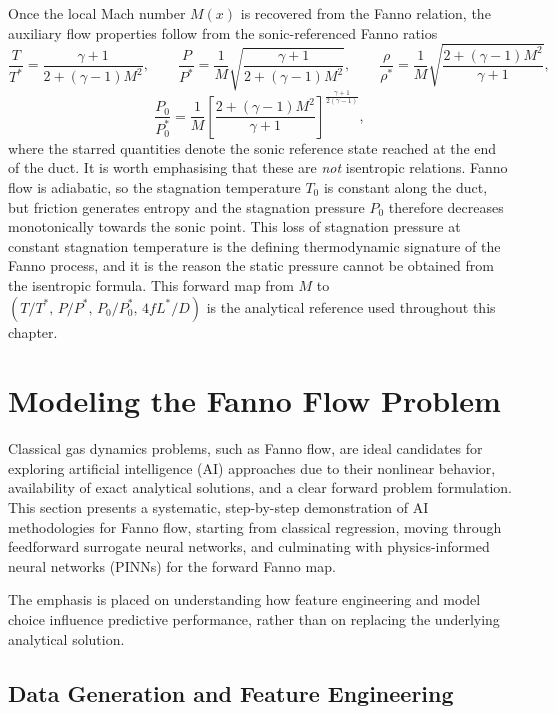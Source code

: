 \documentclass[11pt,a4paper]{report}
\begin{document}
Once the local Mach number $M(x)$ is recovered from the Fanno relation, the auxiliary flow properties follow from the sonic-referenced Fanno ratios
\[
\frac{T}{T^{*}} = \frac{\gamma+1}{2 + (\gamma-1)M^{2}},
\qquad
\frac{P}{P^{*}} = \frac{1}{M}\sqrt{\frac{\gamma+1}{2 + (\gamma-1)M^{2}}},
\qquad
\frac{\rho}{\rho^{*}} = \frac{1}{M}\sqrt{\frac{2 + (\gamma-1)M^{2}}{\gamma+1}},
\]
\[
\frac{P_{0}}{P_{0}^{*}} = \frac{1}{M}\left[ \frac{2 + (\gamma-1)M^{2}}{\gamma+1} \right]^{\frac{\gamma+1}{2(\gamma-1)}},
\]
where the starred quantities denote the sonic reference state reached at the end of the duct. It is worth emphasising that these are \emph{not} isentropic relations. Fanno flow is adiabatic, so the stagnation temperature $T_{0}$ is constant along the duct, but friction generates entropy and the stagnation pressure $P_{0}$ therefore decreases monotonically towards the sonic point. This loss of stagnation pressure at constant stagnation temperature is the defining thermodynamic signature of the Fanno process, and it is the reason the static pressure cannot be obtained from the isentropic formula. This forward map from $M$ to $(T/T^{*},\, P/P^{*},\, P_{0}/P_{0}^{*},\, 4fL^{*}/D)$ is the analytical reference used throughout this chapter.

\section{Modeling the Fanno Flow Problem}

Classical gas dynamics problems, such as Fanno flow, are ideal candidates for exploring artificial intelligence (AI) approaches due to their nonlinear behavior, availability of exact analytical solutions, and a clear forward problem formulation. This section presents a systematic, step-by-step demonstration of AI methodologies for Fanno flow, starting from classical regression, moving through feedforward surrogate neural networks, and culminating with physics-informed neural networks (PINNs) for the forward Fanno map.   

The emphasis is placed on understanding how feature engineering and model choice
influence predictive performance, rather than on replacing the underlying
analytical solution.

\subsection{Data Generation and Feature Engineering}
\label{sec:feature_engineering}
\end{document}
